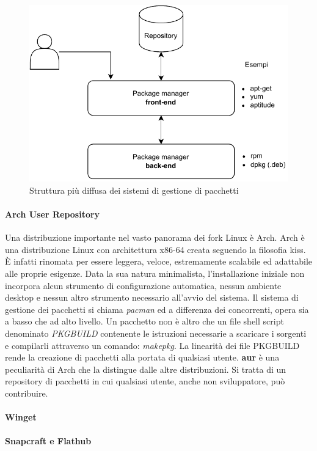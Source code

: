 \begin{figure}[H]
	\centering
	\includegraphics[width=.7\linewidth]{figures/package-managers.pdf}
	\caption{Struttura più diffusa dei sistemi di gestione di pacchetti}
	\label{fig:package-managers}
\end{figure}

\paragraph{Arch User Repository} Una distribuzione importante nel vasto panorama dei fork Linux è Arch. Arch è una distribuzione Linux con architettura x86-64 creata seguendo la filosofia \ac{kiss}. È infatti rinomata per essere leggera, veloce, estremamente scalabile ed adattabile alle proprie esigenze. Data la sua natura minimalista, l'installazione iniziale non incorpora alcun strumento di configurazione automatica, nessun ambiente desktop e nessun altro strumento necessario all'avvio del sistema. Il sistema di gestione dei pacchetti si chiama \textit{pacman} ed a differenza dei concorrenti, opera sia a basso che ad alto livello. Un pacchetto non è altro che un file shell script denominato \textit{PKGBUILD} contenente le istruzioni necessarie a scaricare i sorgenti e compilarli attraverso un comando: \textit{makepkg}. La linearità dei file PKGBUILD rende la creazione di pacchetti alla portata di qualsiasi utente. \textbf{\ac{aur}} è una peculiarità di Arch che la distingue dalle altre distribuzioni. Si tratta di un repository di pacchetti in cui qualsiasi utente, anche non sviluppatore, può contribuire. 

\paragraph{Winget}

\paragraph{Snapcraft e Flathub}

